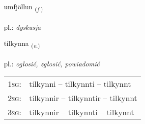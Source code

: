 \documentclass[frontgrid, backgrid]{flacards}\usepackage[]{graphicx}\usepackage[]{xcolor}
\begin{document}
\renewcommand{\flhead}{\vskip5pt \fboxsep=0pt {\small\bfseries\footnotesize Nafnorð | Noun}}
\renewcommand{\fcfoot}{\vskip5pt \fboxsep=0pt \hspace{2pt}{\small\bfseries\footnotesize 1K}}

\renewcommand{\blhead}{\vskip5pt {\small\bfseries\footnotesize Nafnorð | Noun }}
\renewcommand{\bcfoot}{\vskip5pt \hspace{2pt}{\small\bfseries\footnotesize 1K}}


{umfjöllun \small{\textsubscript{(\textit{f.})}} \\[1ex] %
\textphonetic{[ʏmfjœtlʏn]} \\
pl.: \emph{dyskusja} \\  [2ex]
\renewcommand*{\arraystretch}{0.8}
}

\renewcommand{\flhead}{\vskip5pt \fboxsep=0pt {\small\bfseries\footnotesize Sagnorð | Verb}}
\renewcommand{\fcfoot}{\vskip5pt \fboxsep=0pt \hspace{2pt}{\small\bfseries\footnotesize 1K}}

\renewcommand{\blhead}{\vskip5pt {\small\bfseries\footnotesize Sagnorð | Verb }}
\renewcommand{\bcfoot}{\vskip5pt \hspace{2pt}{\small\bfseries\footnotesize 1K}}


{tilkynna \small{\textsubscript{(\textit{v.})}} \\[1ex] %
\textphonetic{[tʰɪlcʰɪna]} \\
pl.: \emph{ogłosić, zgłosić, powiadomić} \\  [2ex]
\renewcommand*{\arraystretch}{0.8}
\begin{tabular}{p{1cm}l}
\textsc{1sg}: & tilkynni -- tilkynnti -- tilkynnt \\ 
\textsc{2sg}: & tilkynnir -- tilkynntir -- tilkynnt \\ 
\textsc{3sg}: & tilkynnir -- tilkynnti -- tilkynnt \\ 
\end{tabular}
}
\end{document}
